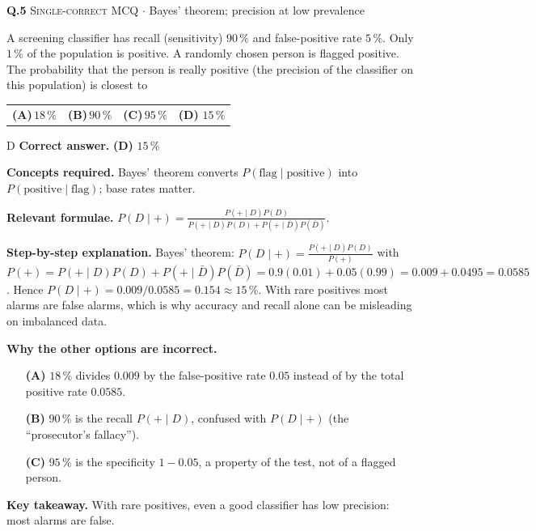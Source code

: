 \documentclass[11pt,a4paper]{article}
\newcommand{\optlabel}[1]{\textbf{(#1)}}
\newcommand{\correctlabel}[1]{\textcolor{okgreen}{\textbf{(#1)}\,\ding{51}}}
\newenvironment{qitem}[1]{\begin{list}{}{\setlength{\leftmargin}{3.3em}\setlength{\labelwidth}{3.1em}%
  \setlength{\labelsep}{0.2em}\setlength{\topsep}{3pt}\setlength{\parsep}{3pt}}\item[\textbf{Q.#1}\hfill]}{\end{list}}
\newcommand{\qsep}{\par\vspace{2pt}{\color{black!15}\hrule}\vspace{4pt}}
\newcommand{\qmeta}[2]{{\footnotesize\color{black!60}\textsc{#1} \;$\cdot$\; #2}\par}
\begin{document}
\begin{qitem}{5}
\qmeta{Single-correct MCQ}{Bayes' theorem; precision at low prevalence}
A screening classifier has recall (sensitivity) $90\,\%$ and false-positive rate $5\,\%$. Only $1\,\%$ of the
population is positive. A randomly chosen person is flagged positive. The probability that the person is really positive
(the precision of the classifier on this population) is closest to
\par\smallskip\noindent\begin{tabularx}{\linewidth}{@{}*{4}{L}@{}}
\optlabel{A}\,$18\,\%$ & \optlabel{B}\,$90\,\%$ & \optlabel{C}\,$95\,\%$ & \correctlabel{D}\,$15\,\%$
\end{tabularx}
\end{qitem}
\begin{solbox}{D}
\textbf{\color{brand}Correct answer.} \textcolor{okgreen}{\textbf{(D)}} $15\,\%$

\textbf{\color{brand}Concepts required.} Bayes' theorem converts $P(\text{flag}\mid\text{positive})$ into $P(\text{positive}\mid\text{flag})$; base rates matter.

\textbf{\color{brand}Relevant formulae.} $P(D\mid +) = \frac{P(+\mid D)P(D)}{P(+\mid D)P(D) + P(+\mid\bar D)P(\bar D)}$.

\textbf{\color{brand}Step-by-step explanation.} Bayes' theorem: $P(D\mid +) = \frac{P(+\mid D)P(D)}{P(+)}$ with
$P(+) = P(+\mid D)P(D) + P(+\mid \bar D)P(\bar D) = 0.9(0.01) + 0.05(0.99) = 0.009 + 0.0495 = 0.0585$.
Hence $P(D\mid +) = 0.009/0.0585 = 0.154 \approx 15\,\%$. With rare positives most alarms are false alarms, which is
why accuracy and recall alone can be misleading on imbalanced data.

\textbf{\color{brand}Why the other options are incorrect.}
\begin{itemize}[leftmargin=2.4em, itemsep=1pt, topsep=2pt]
\item[\textbf{(A)}] $18\,\%$ divides $0.009$ by the false-positive rate $0.05$ instead of by the total positive rate $0.0585$.
\item[\textbf{(B)}] $90\,\%$ is the recall $P(+\mid D)$, confused with $P(D\mid +)$ (the ``prosecutor's fallacy'').
\item[\textbf{(C)}] $95\,\%$ is the specificity $1 - 0.05$, a property of the test, not of a flagged person.
\end{itemize}
\textbf{\color{brand}Key takeaway.} With rare positives, even a good classifier has low precision: most alarms are false.
\end{solbox}
\qsep
\end{document}
